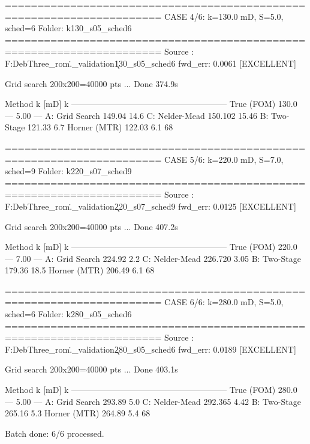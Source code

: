 ======================================================================
 CASE 4/6: k=130.0 mD, S=5.0, sched=6
 Folder: k130_s05_sched6
======================================================================
  Source : F:\Niloy Deb\Part Three\reservoir_rom\notebooks\..\data{}_validation\k130_s05_sched6
  fwd_err: 0.0061  [EXCELLENT]

  Grid search 200x200=40000 pts ...
  Done 374.9s

  Method                   k [mD]   k%
  --------------------------------------------------------
  True (FOM)                130.0       —    5.00       —
  A: Grid Search           149.04   14.6%
  C: Nelder-Mead          150.102  15.46%
  B: Two-Stage             121.33     6.7%
  Horner (MTR)             122.03    6.1%
  68%

======================================================================
 CASE 5/6: k=220.0 mD, S=7.0, sched=9
 Folder: k220_s07_sched9
======================================================================
  Source : F:\Niloy Deb\Part Three\reservoir_rom\notebooks\..\data{}_validation\k220_s07_sched9
  fwd_err: 0.0125  [EXCELLENT]

  Grid search 200x200=40000 pts ...
  Done 407.2s

  Method                   k [mD]   k%
  --------------------------------------------------------
  True (FOM)                220.0       —    7.00       —
  A: Grid Search           224.92    2.2%
  C: Nelder-Mead          226.720   3.05%
  B: Two-Stage             179.36    18.5%
  Horner (MTR)             206.49    6.1%
  68%

======================================================================
 CASE 6/6: k=280.0 mD, S=5.0, sched=6
 Folder: k280_s05_sched6
======================================================================
  Source : F:\Niloy Deb\Part Three\reservoir_rom\notebooks\..\data{}_validation\k280_s05_sched6
  fwd_err: 0.0189  [EXCELLENT]

  Grid search 200x200=40000 pts ...
  Done 403.1s

  Method                   k [mD]   k%
  --------------------------------------------------------
  True (FOM)                280.0       —    5.00       —
  A: Grid Search           293.89    5.0%
  C: Nelder-Mead          292.365   4.42%
  B: Two-Stage             265.16     5.3%
  Horner (MTR)             264.89    5.4%
  68%

Batch done: 6/6 processed.
